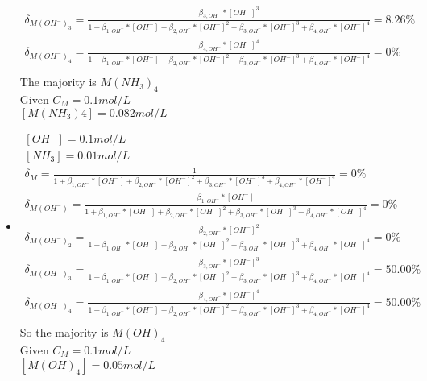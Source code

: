 \documentclass{article}
\begin{document}
\begin{itemize}
\begin{equation}
\begin{multlined}
        \delta_{M\left(OH^-\right)_3} = \frac{\beta_{3, OH^-}*\left[OH^-\right]^3}{1 + \beta_{1, OH^-}*\left[OH^-\right] + \beta_{2, OH^-}*\left[OH^-\right]^2 + \beta_{3, OH^-}*\left[OH^-\right]^3 + \beta_{4, OH^-}*\left[OH^-\right]^4} = 8.26\%\\
        \delta_{M\left(OH^-\right)_4} = \frac{\beta_{4, OH^-}*\left[OH^-\right]^4}{1 + \beta_{1, OH^-}*\left[OH^-\right] + \beta_{2, OH^-}*\left[OH^-\right]^2 + \beta_{3, OH^-}*\left[OH^-\right]^3 + \beta_{4, OH^-}*\left[OH^-\right]^4} = 0\%\\
    \end{multlined}
\end{equation}
The majority is $M(NH_3)_4$\\
Given $C_M = 0.1 mol/L$\\
$[M(NH_3)4] = 0.082 mol/L$\\
\item
\begin{equation}
    \begin{multlined}
        \left[OH^-\right] = 0.1 mol/L\\
        \left[NH_3\right] = 0.01 mol/L\\
        \delta_{M} = \frac{1}{1 + \beta_{1, OH^-}*\left[OH^-\right] + \beta_{2, OH^-}*\left[OH^-\right]^2 + \beta_{3, OH^-}*\left[OH^-\right]^3 + \beta_{4, OH^-}*\left[OH^-\right]^4} = 0\%\\
        \delta_{M\left(OH^-\right)} = \frac{\beta_{1, OH^-}*\left[OH^-\right]}{1 + \beta_{1, OH^-}*\left[OH^-\right] + \beta_{2, OH^-}*\left[OH^-\right]^2 + \beta_{3, OH^-}*\left[OH^-\right]^3 + \beta_{4, OH^-}*\left[OH^-\right]^4} = 0\%\\
        \delta_{M\left(OH^-\right)_2} = \frac{\beta_{2, OH^-}*\left[OH^-\right]^2}{1 + \beta_{1, OH^-}*\left[OH^-\right] + \beta_{2, OH^-}*\left[OH^-\right]^2 + \beta_{3, OH^-}*\left[OH^-\right]^3 + \beta_{4, OH^-}*\left[OH^-\right]^4} = 0\%\\
        \delta_{M\left(OH^-\right)_3} = \frac{\beta_{3, OH^-}*\left[OH^-\right]^3}{1 + \beta_{1, OH^-}*\left[OH^-\right] + \beta_{2, OH^-}*\left[OH^-\right]^2 + \beta_{3, OH^-}*\left[OH^-\right]^3 + \beta_{4, OH^-}*\left[OH^-\right]^4} = 50.00\%\\
        \delta_{M\left(OH^-\right)_4} = \frac{\beta_{4, OH^-}*\left[OH^-\right]^4}{1 + \beta_{1, OH^-}*\left[OH^-\right] + \beta_{2, OH^-}*\left[OH^-\right]^2 + \beta_{3, OH^-}*\left[OH^-\right]^3 + \beta_{4, OH^-}*\left[OH^-\right]^4} = 50.00\%\\
    \end{multlined}
\end{equation}
So the majority is $M(OH)_4$\\
Given $C_M = 0.1 mol/L$\\
$[M(OH)_4] = 0.05 mol/L$\\
\end{itemize}
\end{document}
